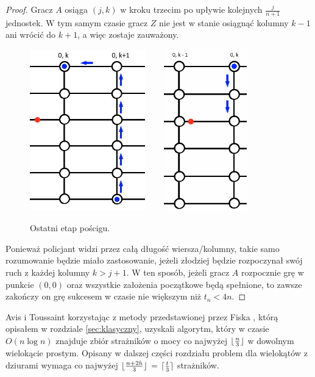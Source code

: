 \documentclass[brudnopis]{xmgr}
\DeclarePairedDelimiter\ceil{\lceil}{\rceil}
\DeclarePairedDelimiter\floor{\lfloor}{\rfloor}
\theoremstyle{definition}
\begin{document}
\begin{proof}
	\indent Gracz $A$ osiąga $(j,k)$ w kroku trzecim po upływie kolejnych $\frac{j}{n+1}$ jednostek. W tym samym czasie gracz $Z$ nie jest w stanie osiągnąć kolumny $k - 1$ ani wrócić do $k + 1$, a więc zostaje zauważony.
	\begin{figure}[ht!]
	  \centering
	  \includegraphics[width=5cm,height=7cm]{rysunki/poscig_4.png}
	  \includegraphics[width=5cm,height=7cm]{rysunki/poscig_5.png}
	  \caption{Ostatni etap pościgu.}
	  \label{fig:ostatni etap poscigu}
    \vspace{5in}
	\end{figure} 

	\indent Ponieważ policjant widzi przez całą długość wiersza/kolumny, takie samo rozumowanie będzie miało zastosowanie, jeżeli złodziej będzie rozpoczynał swój ruch z każdej kolumny $k > j + 1$. W ten sposób, jeżeli gracz $A$ rozpocznie grę w punkcie $(0,0)$ oraz wszystkie założenia początkowe będą spełnione, to zawsze zakończy on grę sukcesem w czasie nie większym niż $t_n < 4n$.
\end{proof} 

\summary
Avis i Toussaint \cite{avis} korzystając z metody przedstawionej przez Fiska \cite{fisk}, którą opisałem w rozdziale \ref{sec:klasyczny}, uzyskali algorytm, który w czasie $O(n \log n)$ znajduje zbiór strażników o mocy co najwyżej $\floor{\frac{n}{3}}$ w dowolnym wielokącie prostym. Opisany w dalszej części rozdziału problem dla wielokątów z dziurami wymaga co najwyżej $\floor{\frac{n+2h}{3}}$ = $\ceil{\frac{t}{3}}$ strażników.
\end{document}
